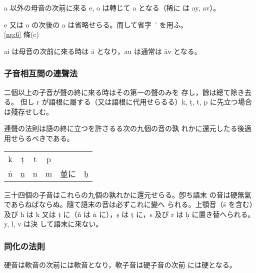 \numberParagraph \label{np:14}
a 以外の母音の次前に來る e, o は轉じて a となる（稀に
は ay, av）。

e 又は o の次後の a は省略せらる。而して省字 \,' を用ふ。\\
\hfill \ref{np:6} 條(c)

\numberParagraph
ai は母音の次前に來る時は ā となり，au は通常は āv となる。


\subsubsection{子音相互間の連聲法}
\numberParagraph
二個以上の子音が聲の終に來る時はその第一の聲のみを
存し，餘は總て除き去る。
但し r が語根に屬する（又は語根に代用せらるる）k, ṭ, t, p
に先立つ場合は殘存せしむ。

\numberParagraph \label{np:17}
連聲の法則は語の終に立つを許さるる次の九個の音の孰
れかに還元したる後適用せらるべきである。

\begin{center}
\begin{tabular}{cccccc}
  k & ṭ & t & p & & \\
  ṅ & ṇ & n & m & 並に & ḥ
\end{tabular}
\end{center}
三十四個の子音はこれらの九個の孰れかに還元せらる。卽ち語末
の音は硬無氣であらねばならぬ。隨て語末の音は必ずこれに變へ
られる。上顎音（ś を含む）及び h は k 又は ṭ に（ñ は ṅ
に），ṣ は ṭ に，s 及び r は ḥ に置き替へられる。y, l, v は決
して語末に來ない。

\subsubsection{同化の法則}
\numberParagraph \label{np:18}
硬音は軟音の次前には軟音となり，軟子音は硬子音の次前
には硬となる。

